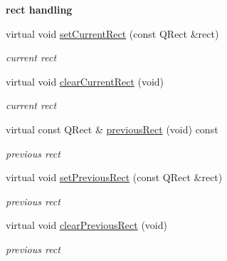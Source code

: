 \begin{Indent}\textbf{ rect handling}\par
\begin{DoxyCompactItemize}
\item 
\mbox{\label{class_menu_bar_data_v2_ac351402d844e10ed0ff2694a763a69ab}} 
virtual void \hyperlink{class_menu_bar_data_v2_ac351402d844e10ed0ff2694a763a69ab}{set\+Current\+Rect} (const Q\+Rect \&rect)
\begin{DoxyCompactList}\small\item\em current rect \end{DoxyCompactList}\item 
\mbox{\label{class_menu_bar_data_v2_a7dc4ec6d75c43faa02c3c61842c1171b}} 
virtual void \hyperlink{class_menu_bar_data_v2_a7dc4ec6d75c43faa02c3c61842c1171b}{clear\+Current\+Rect} (void)
\begin{DoxyCompactList}\small\item\em current rect \end{DoxyCompactList}\item 
\mbox{\label{class_menu_bar_data_v2_ae9e110bea20423e493f00277d3787dfd}} 
virtual const Q\+Rect \& \hyperlink{class_menu_bar_data_v2_ae9e110bea20423e493f00277d3787dfd}{previous\+Rect} (void) const
\begin{DoxyCompactList}\small\item\em previous rect \end{DoxyCompactList}\item 
\mbox{\label{class_menu_bar_data_v2_a3102808249e7869aee7bcc4d53e5b58e}} 
virtual void \hyperlink{class_menu_bar_data_v2_a3102808249e7869aee7bcc4d53e5b58e}{set\+Previous\+Rect} (const Q\+Rect \&rect)
\begin{DoxyCompactList}\small\item\em previous rect \end{DoxyCompactList}\item 
\mbox{\label{class_menu_bar_data_v2_a199903ad6ae352a76e8f80b8dae314f9}} 
virtual void \hyperlink{class_menu_bar_data_v2_a199903ad6ae352a76e8f80b8dae314f9}{clear\+Previous\+Rect} (void)
\begin{DoxyCompactList}\small\item\em previous rect \end{DoxyCompactList}\end{DoxyCompactItemize}
\end{Indent}
